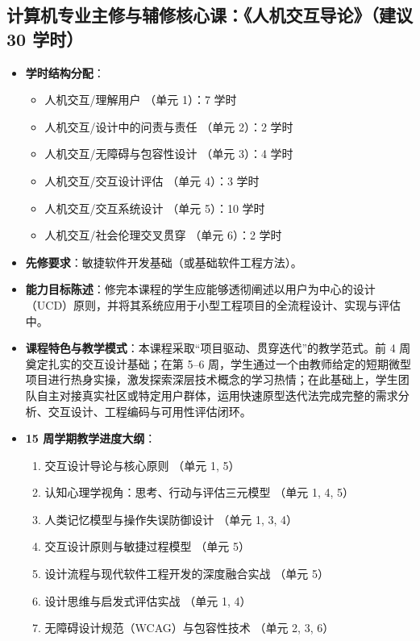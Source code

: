 \subsection{计算机专业主修与辅修核心课：《人机交互导论》（建议 30 学时）}
\begin{itemize}
    \item \textbf{学时结构分配}：
    \begin{itemize}
        \item 人机交互/理解用户 （单元 1）：7 学时
        \item 人机交互/设计中的问责与责任 （单元 2）：2 学时
        \item 人机交互/无障碍与包容性设计 （单元 3）：4 学时
        \item 人机交互/交互设计评估 （单元 4）：3 学时
        \item 人机交互/交互系统设计 （单元 5）：10 学时
        \item 人机交互/社会伦理交叉贯穿 （单元 6）：2 学时
    \end{itemize}
    \item \textbf{先修要求}：敏捷软件开发基础（或基础软件工程方法）。
    \item \textbf{能力目标陈述}：修完本课程的学生应能够透彻阐述以用户为中心的设计（UCD）原则，并将其系统应用于小型工程项目的全流程设计、实现与评估中。
    \item \textbf{课程特色与教学模式}：本课程采取“项目驱动、贯穿迭代”的教学范式。前 4 周奠定扎实的交互设计基础；在第 5--6 周，学生通过一个由教师给定的短期微型项目进行热身实操，激发探索深层技术概念的学习热情；在此基础上，学生团队自主对接真实社区或特定用户群体，运用快速原型迭代法完成完整的需求分析、交互设计、工程编码与可用性评估闭环。
    \item \textbf{15 周学期教学进度大纲}：
    \begin{enumerate}
        \item 交互设计导论与核心原则 （单元 1, 5）
        \item 认知心理学视角：思考、行动与评估三元模型 （单元 1, 4, 5）
        \item 人类记忆模型与操作失误防御设计 （单元 1, 3, 4）
        \item 交互设计原则与敏捷过程模型 （单元 5）
        \item[5--6.] 设计流程与现代软件工程开发的深度融合实战 （单元 5）
        \item[7.] 设计思维与启发式评估实战 （单元 1, 4）
        \item[8.] 无障碍设计规范（WCAG）与包容性技术 （单元 2, 3, 6）

\end{enumerate}
\end{itemize}
